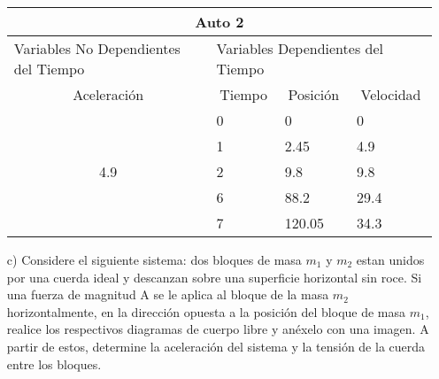 \documentclass[letterpaper, 12pt]{article}
\begin{document}
\begin{itemize}
\begin{table}[h]
\begin{tabular}{|cllll|}
\hline
\multicolumn{5}{|c|}{Auto 2}                                                                                                                              \\ \hline
\multicolumn{2}{|l|}{Variables No Dependientes del Tiempo} & \multicolumn{3}{l|}{Variables Dependientes del Tiempo}                                       \\ \hline
\multicolumn{2}{|c|}{Aceleración}                          & \multicolumn{1}{c|}{Tiempo} & \multicolumn{1}{c|}{Posición} & \multicolumn{1}{c|}{Velocidad} \\ \hline
\multicolumn{2}{|c|}{\multirow{5}{*}{4.9}}                 & \multicolumn{1}{l|}{0}      & \multicolumn{1}{l|}{0}        & 0                              \\ \cline{3-5} 
\multicolumn{2}{|c|}{}                                     & \multicolumn{1}{l|}{1}      & \multicolumn{1}{l|}{2.45}     & 4.9                            \\ \cline{3-5} 
\multicolumn{2}{|c|}{}                                     & \multicolumn{1}{l|}{2}      & \multicolumn{1}{l|}{9.8}      & 9.8                            \\ \cline{3-5} 
\multicolumn{2}{|c|}{}                                     & \multicolumn{1}{l|}{6}      & \multicolumn{1}{l|}{88.2}     & 29.4                           \\ \cline{3-5} 
\multicolumn{2}{|c|}{}                                     & \multicolumn{1}{l|}{7}      & \multicolumn{1}{l|}{120.05}   & 34.3                           \\ \hline
\end{tabular}
\end{table}


 
    \item [c)] Considere el siguiente sistema: dos bloques de masa $m_1$ y $m_2$ estan unidos por una cuerda ideal y descanzan sobre una superficie horizontal sin roce. Si una fuerza de magnitud A se le aplica al bloque de la masa $m_2$ horizontalmente, en la direcci\'on opuesta a la posici\'on del bloque de masa $m_1$, realice los respectivos diagramas de cuerpo libre y an\'exelo con una imagen. A partir de estos, determine la aceleraci\'on del sistema y la tensi\'on de la cuerda entre los bloques. \\


\end{itemize}
\end{document}

